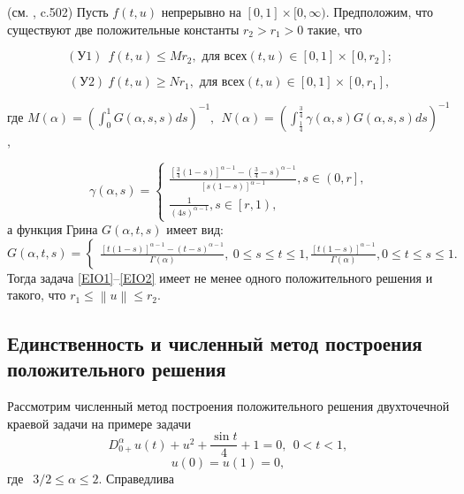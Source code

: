 \begin{theorem}\label{AbEI3.3:th1}(см. \cite{bailu}, c.502) Пусть $f(t,u)$ непрерывно на $\left[0,1\right]\times[0,\infty )$. Предположим, что существуют две положительные константы $r_2>r_1>0$ такие, что

\begin{equation}\left(\text{У}1\right)\ \ f\left(t,u\right)\le Mr_2,\text{ для всех} \left(t,u\right)\in\left[0,1\right]\times\left[0,r_2\right];\label{EIO3}\end{equation}

\begin{equation}\left(\text{У}2\right)\ f\left(t,u\right)\ge Nr_1,\text{ для всех} \left(t,u\right)\in\left[0,1\right]\times\left[0,r_1\right],\label{EIO4}\end{equation}

где  $M\left(\alpha \right)={\left(\int^1_0{G\left(\alpha ,s,s\right)ds}\right)}^{-1},\ \ N\left(\alpha \right)={\left(\int^{\frac{3}{4}}_{\frac{1}{4}}{\gamma \left(\alpha ,s\right)G\left(\alpha ,s,s\right)ds}\right)}^{-1}$,

$$\gamma \left(\alpha ,s\right)=\left\{ \begin{array}{c}
\frac{{[\frac{3}{4}(1-s)]}^{\alpha -1}-{(\frac{3}{4}-s)}^{\alpha -1}}{{[s\left(1-s\right)]}^{\alpha -1}}, s\in \left(0,r\right], \\
\frac{1}{{(4s)}^{\alpha -1}},s\in \left[r,1\right), \end{array}
\right.$$
а функция Грина $G(\alpha ,t,s)$ имеет вид:
\begin{equation}
\label{EIO5}
G\left(\alpha ,t,s\right)=\left\{ \begin{array}{c}
\frac{{\left[t\left(1-s\right)\right]}^{\alpha -1}-{\left(t-s\right)}^{\alpha -1}}{\Gamma\left(\alpha \right)},\ 0\le s\le t\le1, \frac{{\left[t\left(1-s\right)\right]}^{\alpha -1}}{\Gamma\left(\alpha \right)}, 0 \le t \le s \le 1. \end{array}
\right.
\end{equation}
Тогда задача \eqref{EIO1}--\eqref{EIO2} имеет не менее одного положительного решения и такого, что $r_1\le \left\|u\right\|\le r_2$.
\end{theorem}

\subsection{Единственность и  численный метод построения положительного решения}

Рассмотрим численный метод построения положительного решения двухточечной краевой задачи на примере задачи
\begin{equation} \label{EIO6} {D}^{\alpha }_{0+}u\left(t\right)+u^2+\frac{\sin t}{4}+1=0,\ \ 0<t<1,\  \end{equation}
\begin{equation}u\left(0\right)=u\left(1\right)=0,\ \label{EIO7}\end{equation} где $\ \ 3/2\le \alpha \le 2.$
Справедлива

